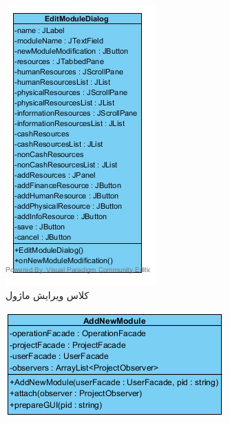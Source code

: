 \begin{figure}[H]
\begin{subfigure}[b]{0.4\textwidth}
	\includegraphics[width=\textwidth]{img/class-design/ui/EditModuleDialog.jpg}
	\caption{کلاس ویرایش ماژول}
	\end{subfigure}
	\begin{subfigure}[b]{0.4\textwidth}
		\includegraphics[width=\textwidth]{img/class-design/ui/AddNewModule.png}

\end{subfigure}
\end{figure}
